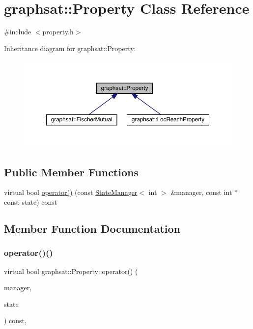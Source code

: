 \hypertarget{classgraphsat_1_1_property}{}\section{graphsat\+::Property Class Reference}
\label{classgraphsat_1_1_property}


{\ttfamily \#include $<$property.\+h$>$}



Inheritance diagram for graphsat\+::Property\+:\nopagebreak
\begin{figure}[H]
\begin{center}
\leavevmode
\includegraphics[width=350pt]{classgraphsat_1_1_property__inherit__graph}
\end{center}
\end{figure}
\subsection*{Public Member Functions}
\begin{DoxyCompactItemize}
\item 
virtual bool \mbox{\hyperlink{classgraphsat_1_1_property_a28a98381d3a2d2a7a67766d0ef90b30a}{operator()}} (const \mbox{\hyperlink{classgraphsat_1_1_state_manager}{State\+Manager}}$<$ int $>$ \&manager, const int $\ast$const state) const
\end{DoxyCompactItemize}


\subsection{Member Function Documentation}
\mbox{\label{classgraphsat_1_1_property_a28a98381d3a2d2a7a67766d0ef90b30a}} 
\subsubsection{\texorpdfstring{operator()()}{operator()()}}
{\footnotesize\ttfamily virtual bool graphsat\+::\+Property\+::operator() (\begin{DoxyParamCaption}\item[{const \mbox{\hyperlink{classgraphsat_1_1_state_manager}{State\+Manager}}$<$ int $>$ \&}]{manager,  }\item[{const int $\ast$const}]{state }\end{DoxyParamCaption}) const\hspace{0.3cm}{\ttfamily [inline]}, {\ttfamily [virtual]}}




